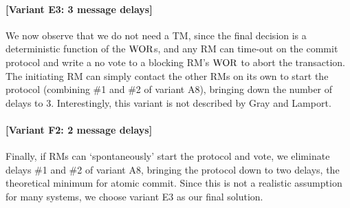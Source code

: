 \paragraph{[Variant E3: 3 message delays]} We now observe that we do not need a TM, 
since the final decision is a deterministic function of the $\mathrm{WOR}$s, 
and any RM can time-out on the commit protocol and write a no vote to a blocking RM's $\mathrm{WOR}$ to abort the transaction. 
The initiating RM can simply contact the other RMs on its own to start the protocol (combining \#1 and \#2 of variant A8), 
bringing down the number of delays to 3. Interestingly, this variant is not described by Gray and Lamport.

\paragraph{[Variant F2: 2 message delays]} Finally, if RMs can `spontaneously' start the protocol and vote, 
we eliminate delays \#1 and \#2 of variant A8, bringing the protocol down to two delays, 
the theoretical minimum for atomic commit. Since this is not a realistic assumption for many systems, we choose variant E3 as our final solution.

